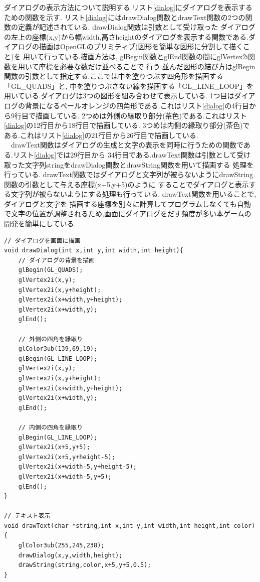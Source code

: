 \documentclass[a4j]{jarticle}
\begin{document}
        ダイアログの表示方法について説明する.リスト\ref{dialog}にダイアログを表示するための関数を示す.
        リスト\ref{dialog}にはdrawDialog関数とdrawText関数の2つの関数の定義が記述されている. drawDialog関数は引数として受け取った
        ダイアログの左上の座標(x,y)から幅width,高さheightのダイアログを表示する関数である.ダイアログの描画はOpenGLのプリミティブ(図形を簡単な図形に分割して描くこと)を
        用いて行っている.描画方法は, glBegin関数とglEnd関数の間にglVertex2i関数を用いて座標を必要な数だけ並べることで
        行う.並んだ図形の結び方はglBegin関数の引数として指定する.ここでは中を塗りつぶす四角形を描画する「GL\_QUADS」と,
        中を塗りつぶさない線を描画する「GL\_LINE\_LOOP」を用いている.ダイアログは3つの図形を組み合わせて表示している.
        1つ目はダイアログの背景になるペールオレンジの四角形である.これはリスト\ref{dialog}の4行目から9行目で描画している.
        2つめは外側の縁取り部分(茶色)である.これはリスト\ref{dialog}の12行目から18行目で描画している.
        3つめは内側の縁取り部分(茶色)である.これはリスト\ref{dialog}の21行目から26行目で描画している.\\
        　drawText関数はダイアログの生成と文字の表示を同時に行うための関数である.リスト\ref{dialog}では29行目から
        34行目である.drawText関数は引数として受け取った文字列stringをdrawDialog関数とdrawString関数を用いて描画する
        処理を行っている. drawText関数ではダイアログと文字列が被らないようにdrawString関数の引数として与える座標(x+5,y+5)のように
        することでダイアログと表示する文字列が被らないようにする処理も行っている. drawText関数を用いることで,ダイアログと文字を
        描画する座標を別々に計算してプログラムしなくても自動で文字の位置が調整されるため,画面にダイアログをだす頻度が多い本ゲームの開発を簡単にしている.
        \begin{lstlisting}[basicstyle=\ttfamily\footnotesize, frame=single,label=dialog,caption=ダイアログ表示の実装]
// ダイアログを画面に描画
void drawDialog(int x,int y,int width,int height){
    // ダイアログの背景を描画
    glBegin(GL_QUADS);
    glVertex2i(x,y);
    glVertex2i(x,y+height);
    glVertex2i(x+width,y+height);
    glVertex2i(x+width,y);
    glEnd();

    // 外側の四角を縁取り
    glColor3ub(139,69,19);
    glBegin(GL_LINE_LOOP);
    glVertex2i(x,y);
    glVertex2i(x,y+height);
    glVertex2i(x+width,y+height);
    glVertex2i(x+width,y);
    glEnd();

    // 内側の四角を縁取り
    glBegin(GL_LINE_LOOP);
    glVertex2i(x+5,y+5);
    glVertex2i(x+5,y+height-5);
    glVertex2i(x+width-5,y+height-5);
    glVertex2i(x+width-5,y+5);
    glEnd();
}

// テキスト表示
void drawText(char *string,int x,int y,int width,int height,int color){
    glColor3ub(255,245,238);
    drawDialog(x,y,width,height);
    drawString(string,color,x+5,y+5,0.5);
}
        \end{lstlisting} 
\end{document}

